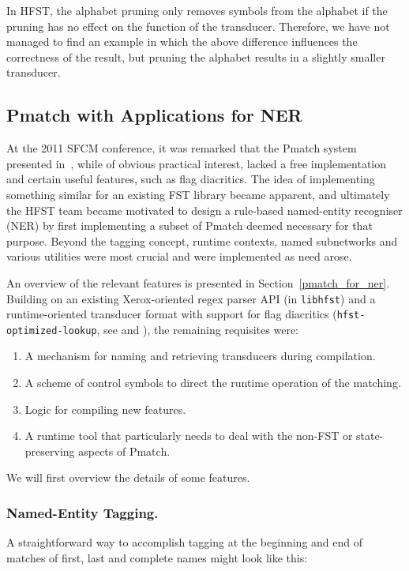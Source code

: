 \documentclass{llncs}
\begin{document}
In HFST, the alphabet pruning only removes symbols from the alphabet
if the pruning has no effect on the function of the transducer.
Therefore, we have not managed to find an example in which the above difference influences
the correctness of the result, but pruning the alphabet results in a slightly smaller transducer.

\subsection{Pmatch with Applications for NER}
At the 2011 SFCM conference, it was remarked that the Pmatch system presented
in~\cite{karttunen/2011}, while
of obvious practical interest, lacked a free implementation and certain
useful features, such as flag diacritics. The idea of implementing
something similar for an existing FST library became apparent, and
ultimately the HFST team became motivated to design a rule-based named-entity
recogniser (NER) by first implementing a subset of Pmatch deemed
necessary for that purpose. Beyond the tagging concept,
runtime contexts, named subnetworks and various utilities were most crucial and
were implemented as need arose.

An overview of the relevant features is presented in Section~\ref{pmatch_for_ner}.
Building on an existing Xerox-oriented regex parser API (in \verb+libhfst+) and a
runtime-oriented transducer format with support for flag diacritics
(\verb+hfst-optimized-lookup+, see \cite{silfverberg/2009} and
\cite{hfst/2011}), the remaining requisites were:

\begin{enumerate}
\item A mechanism for naming and retrieving transducers during compilation.
\item A scheme of control symbols to direct the runtime operation of the matching.
\item Logic for compiling new features.
\item A runtime tool that particularly needs to deal with the non-FST or
state-preserving aspects of Pmatch.
\end{enumerate}

We will first overview the details of some features.

\subsubsection{Named-Entity Tagging.}
A straightforward way to accomplish tagging at the beginning and end of matches
of first, last and complete names might look like this:
\end{document}
